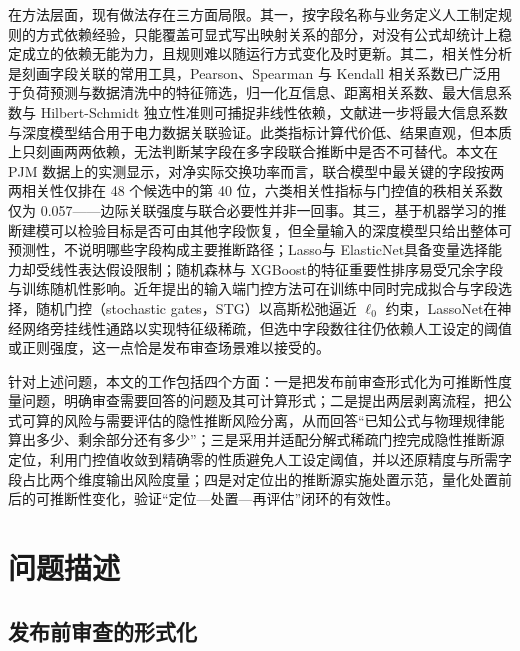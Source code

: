 \documentclass[UTF8,zihao=5,twoside]{ctexart}
\begin{document}
在方法层面，现有做法存在三方面局限。其一，按字段名称与业务定义人工制定规则的方式依赖经验，只能覆盖可显式写出映射关系的部分，对没有公式却统计上稳定成立的依赖无能为力，且规则难以随运行方式变化及时更新。其二，相关性分析是刻画字段关联的常用工具，Pearson、Spearman 与 Kendall 相关系数\cite{ref-pearson,ref-spearman,ref-kendall}已广泛用于负荷预测与数据清洗中的特征筛选\cite{ref-lan-load,ref-jiao-pv,ref-deng-load}，归一化互信息\cite{ref-cover-info}、距离相关系数\cite{ref-szekely-dcorr}、最大信息系数\cite{ref-reshef-mic}与 Hilbert-Schmidt 独立性准则\cite{ref-gretton-hsic}可捕捉非线性依赖，文献\cite{ref-xing-micdnn}进一步将最大信息系数与深度模型结合用于电力数据关联验证。此类指标计算代价低、结果直观，但本质上只刻画两两依赖，无法判断某字段在多字段联合推断中是否不可替代。本文在 PJM 数据上的实测显示，对净实际交换功率而言，联合模型中最关键的字段按两两相关性仅排在 48 个候选中的第 40 位，六类相关性指标与门控值的秩相关系数仅为 0.057——边际关联强度与联合必要性并非一回事。其三，基于机器学习的推断建模可以检验目标是否可由其他字段恢复\cite{ref-lecun-deep,ref-goodfellow-deep,ref-wang-meter}，但全量输入的深度模型只给出整体可预测性，不说明哪些字段构成主要推断路径；Lasso\cite{ref-tibshirani-lasso}与 ElasticNet\cite{ref-zou-enet}具备变量选择能力却受线性表达假设限制；随机森林\cite{ref-breiman-rf}与 XGBoost\cite{ref-chen-xgboost}的特征重要性排序易受冗余字段与训练随机性影响。近年提出的输入端门控方法可在训练中同时完成拟合与字段选择，随机门控（stochastic gates，STG）\cite{ref-stg}以高斯松弛逼近 $\ell_0$ 约束，LassoNet\cite{ref-lassonet}在神经网络旁挂线性通路以实现特征级稀疏，但选中字段数往往仍依赖人工设定的阈值或正则强度，这一点恰是发布审查场景难以接受的。

针对上述问题，本文的工作包括四个方面：一是把发布前审查形式化为可推断性度量问题，明确审查需要回答的问题及其可计算形式；二是提出两层剥离流程，把公式可算的风险与需要评估的隐性推断风险分离，从而回答“已知公式与物理规律能算出多少、剩余部分还有多少”；三是采用并适配分解式稀疏门控完成隐性推断源定位，利用门控值收敛到精确零的性质避免人工设定阈值，并以还原精度与所需字段占比两个维度输出风险度量；四是对定位出的推断源实施处置示范，量化处置前后的可推断性变化，验证“定位—处置—再评估”闭环的有效性。

\section{问题描述}

\subsection{发布前审查的形式化}
\end{document}
